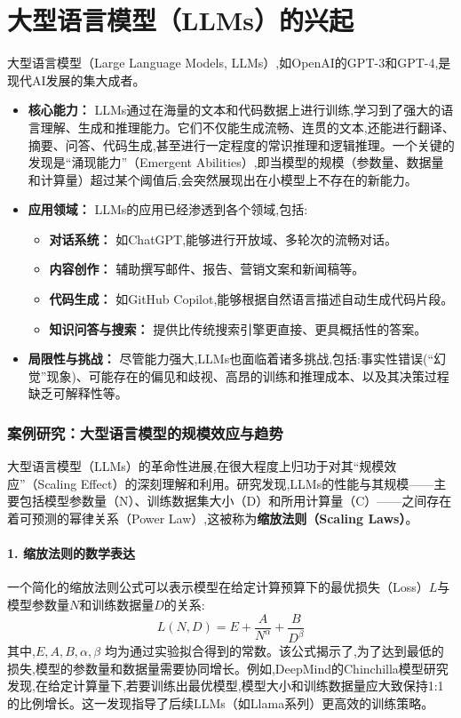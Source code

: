 \section{大型语言模型（LLMs）的兴起}
\label{sec:llms}
大型语言模型（Large Language Models, LLMs）,如OpenAI的GPT-3和GPT-4,是现代AI发展的集大成者。
\begin{itemize}
    \item \textbf{核心能力：} LLMs通过在海量的文本和代码数据上进行训练,学习到了强大的语言理解、生成和推理能力。它们不仅能生成流畅、连贯的文本,还能进行翻译、摘要、问答、代码生成,甚至进行一定程度的常识推理和逻辑推理。一个关键的发现是“涌现能力”（Emergent Abilities）,即当模型的规模（参数量、数据量和计算量）超过某个阈值后,会突然展现出在小模型上不存在的新能力。
    \item \textbf{应用领域：} LLMs的应用已经渗透到各个领域,包括:
        \begin{itemize}
            \item \textbf{对话系统：} 如ChatGPT,能够进行开放域、多轮次的流畅对话。
            \item \textbf{内容创作：} 辅助撰写邮件、报告、营销文案和新闻稿等。
            \item \textbf{代码生成：} 如GitHub Copilot,能够根据自然语言描述自动生成代码片段。
            \item \textbf{知识问答与搜索：} 提供比传统搜索引擎更直接、更具概括性的答案。
        \end{itemize}
    \item \textbf{局限性与挑战：} 尽管能力强大,LLMs也面临着诸多挑战,包括:事实性错误(“幻觉”现象)、可能存在的偏见和歧视、高昂的训练和推理成本、以及其决策过程缺乏可解释性等。
\end{itemize}

\subsubsection*{案例研究：大型语言模型的规模效应与趋势}
\label{sssec:llm_case_study}
大型语言模型（LLMs）的革命性进展,在很大程度上归功于对其“规模效应”（Scaling Effect）的深刻理解和利用。研究发现,LLMs的性能与其规模——主要包括模型参数量（N）、训练数据集大小（D）和所用计算量（C）——之间存在着可预测的幂律关系（Power Law）,这被称为\textbf{缩放法则（Scaling Laws）}。

\paragraph{1. 缩放法则的数学表达}
一个简化的缩放法则公式可以表示模型在给定计算预算下的最优损失（Loss）$L$与模型参数量$N$和训练数据量$D$的关系:
$$ L(N, D) = E + \frac{A}{N^\alpha} + \frac{B}{D^\beta} $$
其中,$E, A, B, \alpha, \beta$ 均为通过实验拟合得到的常数。该公式揭示了,为了达到最低的损失,模型的参数量和数据量需要协同增长。例如,DeepMind的Chinchilla模型研究发现,在给定计算量下,若要训练出最优模型,模型大小和训练数据量应大致保持1:1的比例增长。这一发现指导了后续LLMs（如Llama系列）更高效的训练策略。

